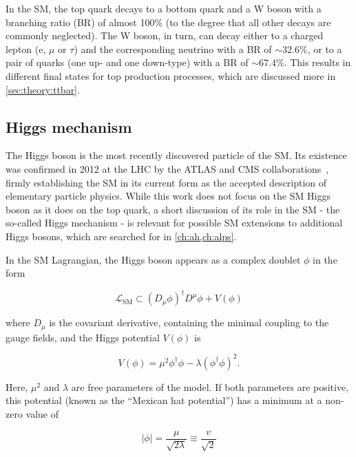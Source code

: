 In the SM, the top quark decays to a bottom quark and a W boson with a branching ratio (BR) of almost 100\% (to the degree that all other decays are commonly neglected). The W boson, in turn, can decay either to a charged lepton (e, $\mu$ or $\tau$) and the corresponding neutrino with a BR of $\sim32.6\%$, or to a pair of quarks (one up- and one down-type) with a BR of $\sim67.4\%$. This results in different final states for top production processes, which are discussed more in \cref{sec:theory:ttbar}.

\subsection{Higgs mechanism}
\label{sec:theory:higgs}

The Higgs boson is the most recently discovered particle of the SM. Its existence was confirmed in 2012 at the LHC by the ATLAS and CMS collaborations~\cite{ATLAS:2012tfa,CMS:HIG-12-028,CMS:HIG-12-036}, firmly establishing the SM in its current form as the accepted description of elementary particle physics. While this work does not focus on the SM Higgs boson as it does on the top quark, a short discussion of its role in the SM - the so-called Higgs mechanism - is relevant for possible SM extensions to additional Higgs bosons, which are searched for in \cref{ch:ah,ch:alps}.

In the SM Lagrangian, the Higgs boson appears as a complex doublet $\phi$ in the form

\begin{equation}
    \mathcal{L}_{\mathrm{SM}} \subset \left(D_\mu \phi\right)^\dagger D^\mu \phi + V(\phi)
\end{equation}

\noindent where $D_\mu$ is the covariant derivative, containing the minimal coupling to the gauge fields, and the Higgs potential $V(\phi)$ is 

\begin{equation}
    V(\phi) = \mu^2 \phi^\dagger \phi - \lambda (\phi^\dagger \phi)^2 .
\end{equation}

Here, $\mu^2$ and $\lambda$ are free parameters of the model. If both parameters are positive, this potential (known as the ``Mexican hat potential'') has a minimum at a non-zero value of

\begin{equation}
    | \phi | = \frac{\mu}{\sqrt{2 \lambda}} \equiv \frac{v}{\sqrt{2}}
\end{equation}

